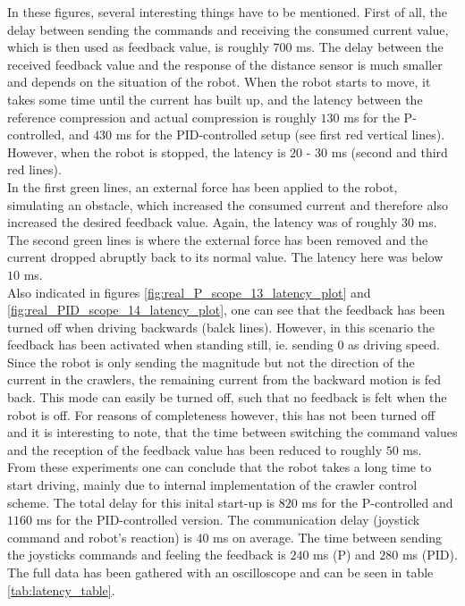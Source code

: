 In these figures, several interesting things have to be mentioned. First of all, the delay between sending the commands and receiving the consumed current value, which is then used as feedback value, is roughly $700$ ms. The delay between the received feedback value and the response of the distance sensor is much smaller and depends on the situation of the robot. When the robot starts to move, it takes some time until the current has built up, and the latency between the reference compression and actual compression is roughly $130$ ms for the P-controlled, and $430$ ms for the PID-controlled setup (see first red vertical lines). However, when the robot is stopped, the latency is $20$ - $30$ ms (second and third red lines).\\
In the first green lines, an external force has been applied to the robot, simulating an obstacle, which increased the consumed current and therefore also increased the desired feedback value. Again, the latency was of roughly $30$ ms. The second green lines is where the external force has been removed and the current dropped abruptly back to its normal value. The latency here was below $10$ ms.\\
Also indicated in figures \ref{fig:real_P_scope_13_latency_plot} and \ref{fig:real_PID_scope_14_latency_plot}, one can see that the feedback has been turned off when driving backwards (balck lines). However, in this scenario the feedback has been activated when standing still, ie. sending $0$ as driving speed. Since the robot is only sending the magnitude but not the direction of the current in the crawlers, the remaining current from the backward motion is fed back. This mode can easily be turned off, such that no feedback is felt when the robot is off. For reasons of completeness however, this has not been turned off and it is interesting to note, that the time between switching the command values and the reception of the feedback value has been reduced to roughly $50$ ms. \\
From these experiments one can conclude that the robot takes a long time to start driving, mainly due to internal implementation of the crawler control scheme. The total delay for this inital start-up is $820$ ms for the P-controlled and $1160$ ms for the PID-controlled version. The communication delay (joystick command and robot's reaction) is $40$ ms on average. The time between sending the joysticks commands and feeling the feedback is $240$ ms (P) and $280$ ms (PID). The full data has been gathered with an oscilloscope and can be seen in table \ref{tab:latency_table}.

